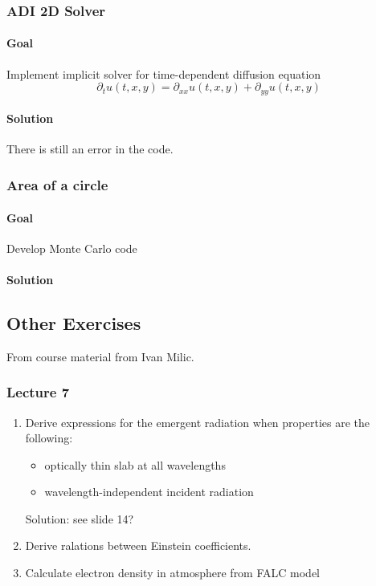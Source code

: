 \documentclass[../main/main.tex]{subfiles}
\begin{document}
\subsubsection{ADI 2D Solver}
\paragraph{Goal} Implement implicit solver for time-dependent diffusion equation
\begin{equation}
\partial_t u(t,x,y) = \partial_{xx}u(t,x,y) + \partial_{yy}u(t,x,y)
\end{equation}
\paragraph{Solution}
There is still an error in the code. 


\subsubsection{Area of a circle}
\paragraph{Goal}
Develop Monte Carlo code
\paragraph{Solution}

\subsection{Other Exercises}
From course material from Ivan Milic.
\subsubsection{Lecture 7}
\begin{enumerate}
\item Derive expressions for the emergent radiation when properties are the following:
\begin{itemize}
\item optically thin slab at all wavelengths
\item wavelength-independent incident radiation
\end{itemize}
Solution: see slide 14?

\item Derive ralations between Einstein coefficients.

\item Calculate electron density in atmosphere from FALC model
\end{enumerate}
\end{document}
